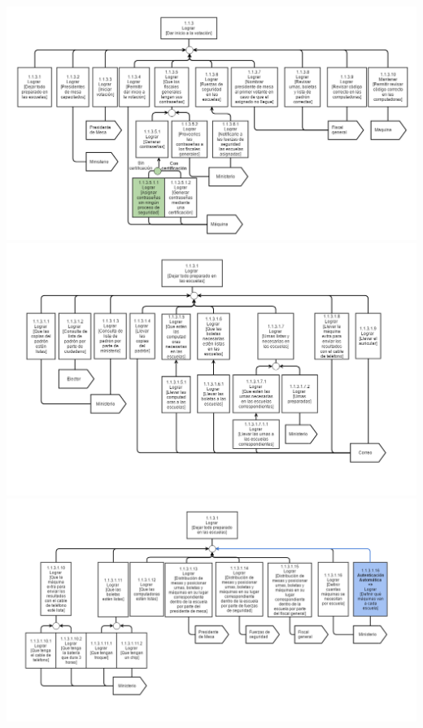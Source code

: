 \\
\includegraphics[scale=0.55]{imagenes/Diagramas/11/113.png}
\\
\includegraphics[scale=0.55]{imagenes/Diagramas/11/1131a.png}
\\
\includegraphics[scale=0.55]{imagenes/Diagramas/11/1131b.png}
\\
